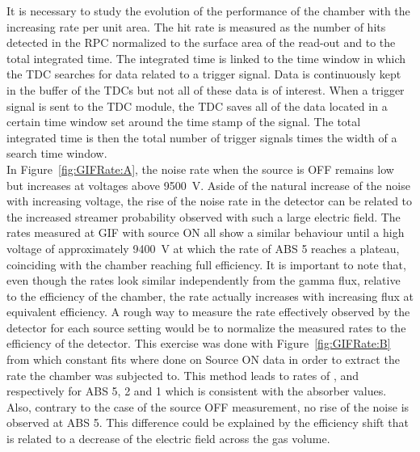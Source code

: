 	It is necessary to study the evolution of the performance of the chamber with the increasing rate per unit area. The hit rate is measured as the number of hits detected in the RPC normalized to the surface area of the read-out and to the total integrated time. The integrated time is linked to the time window in which the TDC searches for data related to a trigger signal. Data is continuously kept in the buffer of the TDCs but not all of these data is of interest. When a trigger signal is sent to the TDC module, the TDC saves all of the data located in a certain time window set around the time stamp of the signal. The total integrated time is then the total number of trigger signals times the width of a search time window.\\
	In Figure~\ref{fig:GIFRate:A}, the noise rate when the source is OFF remains low but increases at voltages above \SI{9500}{V}. Aside of the natural increase of the noise with increasing voltage, the rise of the noise rate in the detector can be related to the increased streamer probability observed with such a large electric field. The rates measured at GIF with source ON all show a similar behaviour until a high voltage of approximately \SI{9400}{V} at which the rate of ABS 5 reaches a plateau, coinciding with the chamber reaching full efficiency. It is important to note that, even though the rates look similar independently from the gamma flux, relative to the efficiency of the chamber, the rate actually increases with increasing flux at equivalent efficiency. A rough way to measure the rate effectively observed by the detector for each source setting would be to normalize the measured rates to the efficiency of the detector. This exercise was done with Figure~\ref{fig:GIFRate:B} from which constant fits where done on Source ON data in order to extract the rate the chamber was subjected to. This method leads to rates of ,  and  respectively for ABS 5, 2 and 1 which is consistent with the absorber values. Also, contrary to the case of the source OFF measurement, no rise of the noise is observed at ABS 5. This difference could be explained by the efficiency shift that is related to a decrease of the electric field across the gas volume.
	
